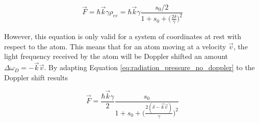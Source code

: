 \begin{equation}\label{eq:radiation_pressure_no_doppler}
	\vec{F} = \hbar \vec{k} \gamma \rho_{ee} = \hbar \vec{k} \gamma \frac{s_0/2}{1 + s_0 + \Big(\frac{2\delta}{\gamma}\Big)^2}
\end{equation}

However, this equation is only valid for a system of coordinates at rest with respect to the atom. This means that for an atom moving at a velocity $\vec{v}$, the light frequency received by the atom will be Doppler shifted an amount  $\Delta \omega_D = -\vec{k}\vec{v}$. By adapting Equation \ref{eq:radiation_pressure_no_doppler} to the Doppler shift results

 \begin{equation}\label{eq:radiation_pressure}
 	\vec{F} = \frac{\hbar \vec{k} \gamma}{2} \frac{s_0}{1 + s_0 + \Big(\frac{2(\delta-\vec{k}\vec{v})}{\gamma}\Big)^2}
 \end{equation}


